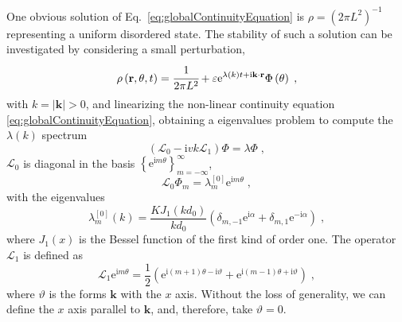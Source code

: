 \documentclass{article}
\begin{document}
One obvious solution of Eq.~\eqref{eq:globalContinuityEquation} is $\rho=(2\pi L^2)^{-1}$ representing a uniform disordered state. The stability of such a solution can be investigated by considering a small perturbation,
\begin{eqnarray}
    \rho \left( \mathbf{r},\theta ,t \right) =\cfrac{1}{2\pi L^2}+\varepsilon \mathrm{e}^{\lambda \left( k \right) t+\mathrm{i}\mathbf{k}\cdot \mathbf{r}}\Phi \left( \theta \right) \;,
\end{eqnarray}
with $k=\left| \mathbf{k} \right|>0$, and linearizing the non-linear continuity equation \eqref{eq:globalContinuityEquation}, obtaining a eigenvalues problem to compute the $\lambda(k)$ spectrum
\begin{equation}
    \left( \mathcal{L} _0-\mathrm{i}vk\mathcal{L} _1 \right) \Phi =\lambda \Phi \;,
\end{equation}
$\mathcal{L}_0$ is diagonal in the basis $\left\{ \mathrm{e}^{\mathrm{i}m\theta} \right\} _{m=-\infty}^{\infty}$,
\begin{equation}
    \mathcal{L} _0\Phi _m=\lambda _{m}^{\left[ 0 \right]}\mathrm{e}^{\mathrm{i}m\theta}\;,
\end{equation}
with the eigenvalues
\begin{equation}
    \lambda _{m}^{\left[ 0 \right]}\left( k \right) =\frac{KJ_1\left( kd_0 \right)}{kd_0}\left( \delta _{m,-1}\mathrm{e}^{\mathrm{i}\alpha}+\delta _{m,1}\mathrm{e}^{-\mathrm{i}\alpha} \right)  \;,
\end{equation}
where $J_1\left( x \right)$ is the Bessel function of the first kind of order one. The operator $\mathcal{L}_1$ is defined as
\begin{equation}
    \mathcal{L} _1\mathrm{e}^{\mathrm{i}m\theta}=\frac{1}{2}\left( \mathrm{e}^{\mathrm{i}\left( m+1 \right) \theta -\mathrm{i}\vartheta}+\mathrm{e}^{\mathrm{i}\left( m-1 \right) \theta +\mathrm{i}\vartheta} \right)  \;,
\end{equation}
where $\vartheta$ is the forms $\mathbf{k}$ with the $x$ axis. Without the loss of generality, we can define the $x$ axis parallel to $\mathbf{k}$, and, therefore, take $\vartheta = 0$. 
\end{document}

